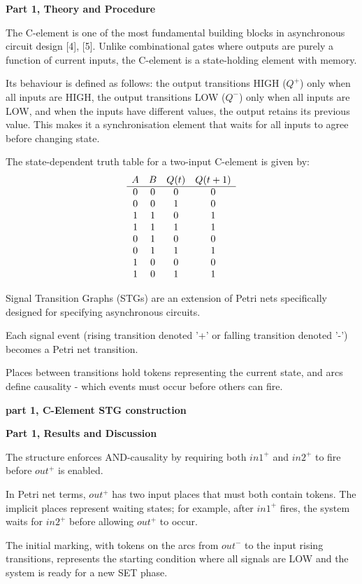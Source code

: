\documentclass[a4paper,12pt]{article}
\begin{document}
\textbf{Part 1, Theory and Procedure}

The C-element is one of the most fundamental building blocks in asynchronous circuit design [4], [5]. Unlike combinational gates where outputs are purely a function of current inputs, the C-element is a state-holding element with memory. 

Its behaviour is defined as follows: the output transitions HIGH ($Q^+$) only when all inputs are HIGH, the output transitions LOW ($Q^-$) only when all inputs are LOW, and when the inputs have different values, the output retains its previous value. This makes it a synchronisation element that waits for all inputs to agree before changing state.

The state-dependent truth table for a two-input C-element is given by:
\[
\begin{array}{c c c c}
A & B & Q(t) & Q(t+1) \\
\hline
0 & 0 & 0 & 0 \\
0 & 0 & 1 & 0 \\
1 & 1 & 0 & 1 \\
1 & 1 & 1 & 1 \\
0 & 1 & 0 & 0 \\
0 & 1 & 1 & 1 \\
1 & 0 & 0 & 0 \\
1 & 0 & 1 & 1
\end{array}
\]

Signal Transition Graphs (STGs) are an extension of Petri nets specifically designed for specifying asynchronous circuits. 

Each signal event (rising transition denoted '+' or falling transition denoted '-') becomes a Petri net transition. 

Places between transitions hold tokens representing the current state, and arcs define causality - which events must occur before others can fire.

\textbf{part 1, C-Element STG construction}

\textbf{Part 1, Results and Discussion}

The structure enforces AND-causality by requiring both $in1^+$ and $in2^+$ to fire before $out^+$ is enabled. 

In Petri net terms, $out^+$ has two input places that must both contain tokens. The implicit places represent waiting states; for example, after $in1^+$ fires, the system waits for $in2^+$ before allowing $out^+$ to occur. 

The initial marking, with tokens on the arcs from $out^-$ to the input rising transitions, represents the starting condition where all signals are LOW and the system is ready for a new SET phase. 
\end{document}

